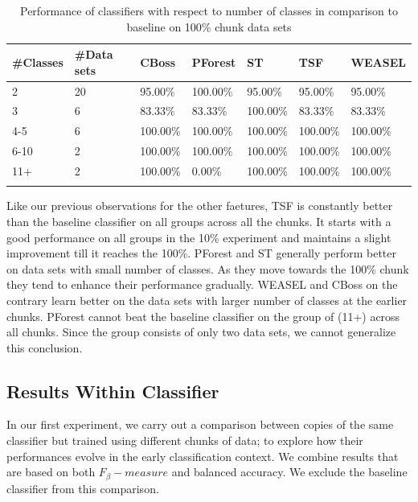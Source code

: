 \begin{table}[hp!]
	\setlength\extrarowheight{2pt} %
	\begin{tabularx}{\textwidth}{|X|X|X|X|X|X|X|}
	\hline
	\textbf{\#Classes} & \textbf{\#Data sets} & \textbf{CBoss} & \textbf{PForest} & \textbf{ST} & \textbf{TSF} & \textbf{WEASEL} \\ \hline
		2 & 20 & 95.00\% & 100.00\% & 95.00\% & 95.00\% & 95.00\% \\ \hline
		3 & 6 & 83.33\% & 83.33\% & 100.00\% & 83.33\% & 83.33\% \\ \hline
		4-5 & 6 & 100.00\% & 100.00\% & 100.00\% & 100.00\% & 100.00\% \\ \hline
		6-10 & 2 & 100.00\% & 100.00\% & 100.00\% & 100.00\% & 100.00\% \\ \hline
		11+ & 2 & 100.00\% & 0.00\% & 100.00\% & 100.00\% & 100.00\% \\ \hline
  \caption{Performance of classifiers with respect to number of classes in comparison to baseline on 100\% chunk data sets}
  \label{TableNumClass100}
  \end{tabularx}
\end{table}

Like our previous observations for the other faetures, TSF is constantly better than the baseline classifier on all groups across all the chunks.
It starts with a good performance on all groups in the 10\% experiment and maintains a slight improvement till it reaches the 100\%.
PForest and ST generally perform better on data sets with small number of classes. As they move towards the 100\% chunk they tend to enhance their performance gradually.
WEASEL and CBoss on the contrary learn better on the data sets with larger number of classes at the earlier chunks.
PForest cannot beat the baseline classifier on the group of (11+) across all chunks. Since the group consists of only two data sets, we cannot generalize this conclusion.


\subsection{Results Within Classifier}
\label{SubsectionWithinComparison}
In our first experiment, we carry out a comparison between copies of the same classifier but trained using different chunks of data;
to explore how their performances evolve in the early classification context. We combine results that are based on both $F_{\beta}-measure$ and balanced accuracy.
We exclude the baseline classifier from this comparison.


